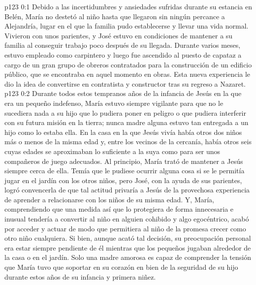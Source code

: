 \author{Comisión de seres intermedios}
\vs p123 0:1 Debido a las incertidumbres y ansiedades sufridas durante su estancia en Belén, María no destetó al niño hasta que llegaron sin ningún percance a Alejandría, lugar en el que la familia pudo establecerse y llevar una vida normal. Vivieron con unos parientes, y José estuvo en condiciones de mantener a su familia al conseguir trabajo poco después de su llegada. Durante varios meses, estuvo empleado como carpintero y luego fue ascendido al puesto de capataz a cargo de un gran grupo de obreros contratados para la construcción de un edificio público, que se encontraba en aquel momento en obras. Esta nueva experiencia le dio la idea de convertirse en contratista y constructor tras su regreso a Nazaret.
\vs p123 0:2 \pc Durante todos estos tempranos años de la infancia de Jesús en la que era un pequeño indefenso, María estuvo siempre vigilante para que no le sucediera nada a su hijo que lo pudiera poner en peligro o que pudiera interferir con su futura misión en la tierra; nunca madre alguna estuvo tan entregada a un hijo como lo estaba ella. En la casa en la que Jesús vivía había otros dos niños más o menos de la misma edad y, entre los vecinos de la cercanía, había otros seis cuyas edades se aproximaban lo suficiente a la suya como para ser unos compañeros de juego adecuados. Al principio, María trató de mantener a Jesús siempre cerca de ella. Temía que le pudiese ocurrir alguna cosa si se le permitía jugar en el jardín con los otros niños, pero José, con la ayuda de sus parientes, logró convencerla de que tal actitud privaría a Jesús de la provechosa experiencia de aprender a relacionarse con los niños de su misma edad. Y, María, comprendiendo que una medida así que lo protegiera de forma innecesaria e inusual tendería a convertir al niño en alguien cohibido y algo egocéntrico, acabó por acceder y actuar de modo que permitiera al niño de la promesa crecer como otro niño cualquiera. Si bien, aunque acató tal decisión, su preocupación personal era estar siempre pendiente de él mientras que los pequeños jugaban alrededor de la casa o en el jardín. Solo una madre amorosa es capaz de comprender la tensión que María tuvo que soportar en su corazón en bien de la seguridad de su hijo durante estos años de su infancia y primera niñez.
